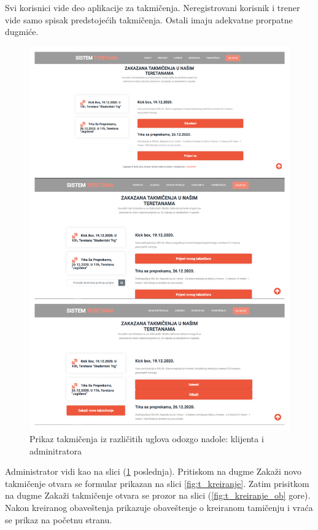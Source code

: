 \documentclass[../main.tex]{subfiles}
\begin{document}
Svi korisnici vide deo aplikacije za takmičenja. Neregistrovani korisnik i trener vide samo spisak predstojećih takmičenja. Ostali imaju adekvatne prorpatne dugmiće.

\begin{figure}[!ht]
\begin{center}
\includegraphics[scale=0.30]{sections/korisnicki_interfejs/screenshots/takmicenjaRazlUglovi.png}
\end{center}
\caption{Prikaz takmičenja iz različitih uglova odozgo nadole:  klijenta i adminitratora }
\label{fig:takmicenja_uglovi}
\end{figure}

Administrator vidi kao na slici (\ref{fig:takmicenja_uglovi} poslednja). Pritiskom na dugme Zakaži novo takmičenje otvara se formular prikazan na slici \ref{fig:t_kreiranje}. Zatim prisitkom na dugme Zakaži takmičenje otvara se prozor na slici (\ref{fig:t_kreiranje_ob} gore). Nakon kreiranog obaveštenja prikazuje obaveštenje o kreiranom tamičenju i vraća se prikaz na početnu stranu. 
\end{document}
